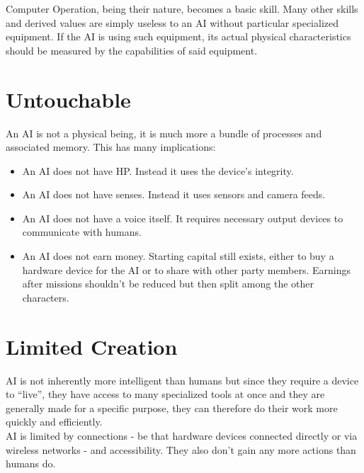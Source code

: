 \documentclass[12pt,a4paper]{book}
\begin{document}
	Computer Operation, being their nature, becomes a basic skill. Many other skills and derived values are simply useless to an AI without particular specialized equipment. If the AI is using such equipment, its actual physical characteristics should be measured by the capabilities of said equipment.

	\chapter{Untouchable}
	An AI is not a physical being, it is much more a bundle of processes and associated memory. This has many implications:
	\begin{itemize}
		\item An AI does not have HP. Instead it uses the device’s integrity.
		\item An AI does not have senses. Instead it uses sensors and camera feeds.
		\item An AI does not have a voice itself. It requires necessary output devices to communicate with humans.
		\item An AI does not earn money. Starting capital still exists, either to buy a hardware device for the AI or to share with other party members. Earnings after missions shouldn’t be reduced but then split among the other characters.
	\end{itemize}
	
	\chapter{Limited Creation}
	AI is not inherently more intelligent than humans but since they require a device to “live”, they have access to many specialized tools at once and they are generally made for a specific purpose, they can therefore do their work more quickly and efficiently.\\
	AI is limited by connections - be that hardware devices connected directly or via wireless networks - and accessibility. They also don’t gain any more actions than humans do.
	
\end{document}
